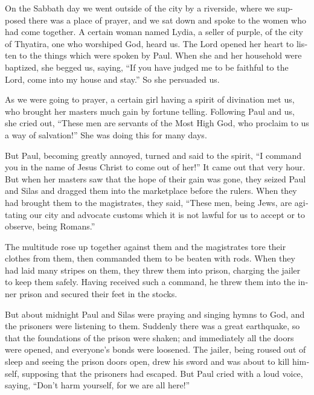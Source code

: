 \begin{paracol}{2}
\begin{otherlanguage}{english}
 On the Sabbath day we went outside of the city by a
riverside, where we supposed there was a place of prayer, and we sat
down and spoke to the women who had come together.  A
certain woman named Lydia, a seller of purple, of the city of Thyatira,
one who worshiped God, heard us. The Lord opened her heart to listen to
the things which were spoken by Paul.  When she and her
household were baptized, she begged us, saying, ``If you have judged me
to be faithful to the Lord, come into my house and stay.'' So she
persuaded us.

 As we were going to prayer, a certain girl having a
spirit of divination met us, who brought her masters much gain by
fortune telling.  Following Paul and us, she cried out,
``These men are servants of the Most High God, who proclaim to us a way
of salvation!''  She was doing this for many days.

But Paul, becoming greatly annoyed, turned and said to the spirit, ``I
command you in the name of Jesus Christ to come out of her!'' It came
out that very hour.  But when her masters saw that the
hope of their gain was gone, they seized Paul and Silas and dragged them
into the marketplace before the rulers.  When they had
brought them to the magistrates, they said, ``These men, being Jews, are
agitating our city  and advocate customs which it is not
lawful for us to accept or to observe, being Romans.''

 The multitude rose up together against them and the
magistrates tore their clothes from them, then commanded them to be
beaten with rods.  When they had laid many stripes on
them, they threw them into prison, charging the jailer to keep them
safely.  Having received such a command, he threw them
into the inner prison and secured their feet in the stocks.

 But about midnight Paul and Silas were praying and
singing hymns to God, and the prisoners were listening to them.
 Suddenly there was a great earthquake, so that the
foundations of the prison were shaken; and immediately all the doors
were opened, and everyone's bonds were loosened.  The
jailer, being roused out of sleep and seeing the prison doors open, drew
his sword and was about to kill himself, supposing that the prisoners
had escaped.  But Paul cried with a loud voice, saying,
``Don't harm yourself, for we are all here!''


\end{otherlanguage}
\end{paracol}
